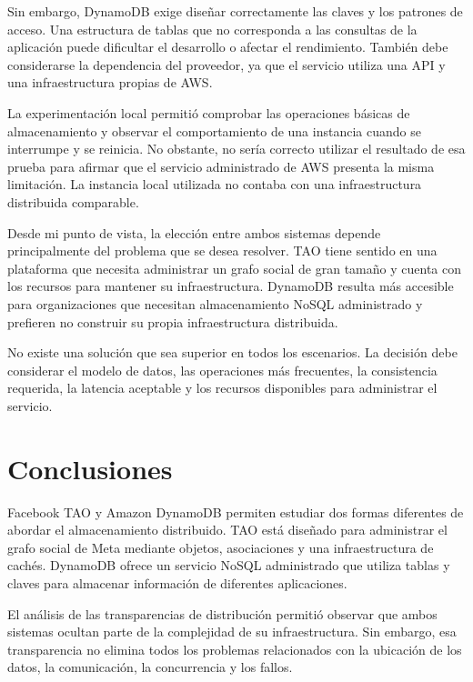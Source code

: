 \documentclass[12pt,a4paper]{article}
\begin{document}
Sin embargo, DynamoDB exige diseñar correctamente las claves y los patrones de acceso. Una estructura de tablas que no corresponda a las consultas de la aplicación puede dificultar el desarrollo o afectar el rendimiento. También debe considerarse la dependencia del proveedor, ya que el servicio utiliza una API y una infraestructura propias de AWS.

La experimentación local permitió comprobar las operaciones básicas de almacenamiento y observar el comportamiento de una instancia cuando se interrumpe y se reinicia. No obstante, no sería correcto utilizar el resultado de esa prueba para afirmar que el servicio administrado de AWS presenta la misma limitación. La instancia local utilizada no contaba con una infraestructura distribuida comparable.

Desde mi punto de vista, la elección entre ambos sistemas depende principalmente del problema que se desea resolver. TAO tiene sentido en una plataforma que necesita administrar un grafo social de gran tamaño y cuenta con los recursos para mantener su infraestructura. DynamoDB resulta más accesible para organizaciones que necesitan almacenamiento NoSQL administrado y prefieren no construir su propia infraestructura distribuida.

No existe una solución que sea superior en todos los escenarios. La decisión debe considerar el modelo de datos, las operaciones más frecuentes, la consistencia requerida, la latencia aceptable y los recursos disponibles para administrar el servicio.

\section{Conclusiones}

Facebook TAO y Amazon DynamoDB permiten estudiar dos formas diferentes de abordar el almacenamiento distribuido. TAO está diseñado para administrar el grafo social de Meta mediante objetos, asociaciones y una infraestructura de cachés. DynamoDB ofrece un servicio NoSQL administrado que utiliza tablas y claves para almacenar información de diferentes aplicaciones.

El análisis de las transparencias de distribución permitió observar que ambos sistemas ocultan parte de la complejidad de su infraestructura. Sin embargo, esa transparencia no elimina todos los problemas relacionados con la ubicación de los datos, la comunicación, la concurrencia y los fallos.
\end{document}
